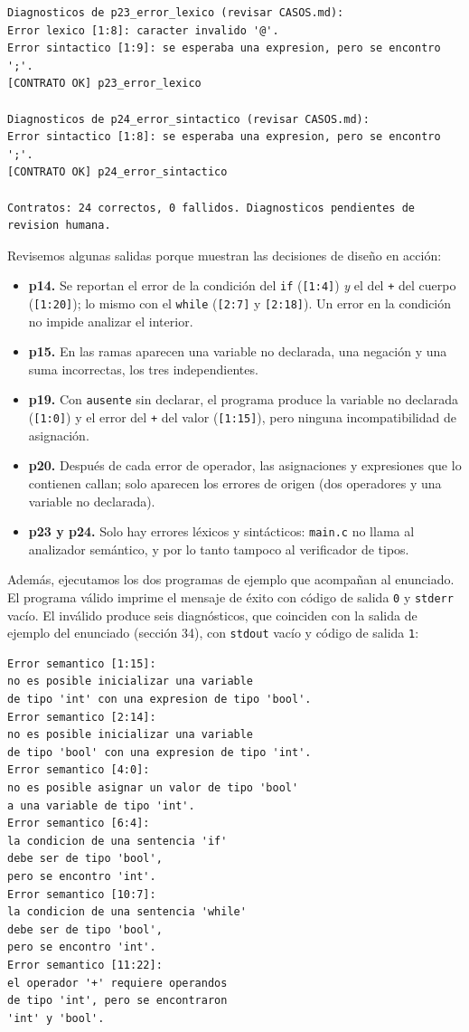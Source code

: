 \documentclass[12pt,letterpaper]{article}
\begin{document}
\begin{verbatim}
Diagnosticos de p23_error_lexico (revisar CASOS.md):
Error lexico [1:8]: caracter invalido '@'.
Error sintactico [1:9]: se esperaba una expresion, pero se encontro ';'.
[CONTRATO OK] p23_error_lexico

Diagnosticos de p24_error_sintactico (revisar CASOS.md):
Error sintactico [1:8]: se esperaba una expresion, pero se encontro ';'.
[CONTRATO OK] p24_error_sintactico

Contratos: 24 correctos, 0 fallidos. Diagnosticos pendientes de revision humana.
\end{verbatim}

Revisemos algunas salidas porque muestran las decisiones de diseño en acción:

\begin{itemize}
\item \textbf{p14.} Se reportan el error de la condición del \texttt{if} (\texttt{[1:4]}) \emph{y} el del
  \texttt{+} del cuerpo (\texttt{[1:20]}); lo mismo con el \texttt{while} (\texttt{[2:7]} y \texttt{[2:18]}). Un
  error en la condición no impide analizar el interior.
\item \textbf{p15.} En las ramas aparecen una variable no declarada, una negación y una suma incorrectas, los
  tres independientes.
\item \textbf{p19.} Con \texttt{ausente} sin declarar, el programa produce la variable no declarada
  (\texttt{[1:0]}) y el error del \texttt{+} del valor (\texttt{[1:15]}), pero ninguna incompatibilidad de
  asignación.
\item \textbf{p20.} Después de cada error de operador, las asignaciones y expresiones que lo contienen callan; solo
  aparecen los errores de origen (dos operadores y una variable no declarada).
\item \textbf{p23 y p24.} Solo hay errores léxicos y sintácticos: \texttt{main.c} no llama al analizador
  semántico, y por lo tanto tampoco al verificador de tipos.
\end{itemize}

Además, ejecutamos los dos programas de ejemplo que acompañan al enunciado. El programa válido imprime el
mensaje de éxito con código de salida \texttt{0} y \texttt{stderr} vacío. El inválido produce seis diagnósticos,
que coinciden con la salida de ejemplo del enunciado (sección 34), con \texttt{stdout} vacío y código de salida
\texttt{1}:

\begin{verbatim}
Error semantico [1:15]:
no es posible inicializar una variable
de tipo 'int' con una expresion de tipo 'bool'.
Error semantico [2:14]:
no es posible inicializar una variable
de tipo 'bool' con una expresion de tipo 'int'.
Error semantico [4:0]:
no es posible asignar un valor de tipo 'bool'
a una variable de tipo 'int'.
Error semantico [6:4]:
la condicion de una sentencia 'if'
debe ser de tipo 'bool',
pero se encontro 'int'.
Error semantico [10:7]:
la condicion de una sentencia 'while'
debe ser de tipo 'bool',
pero se encontro 'int'.
Error semantico [11:22]:
el operador '+' requiere operandos
de tipo 'int', pero se encontraron
'int' y 'bool'.
\end{verbatim}
\end{document}
